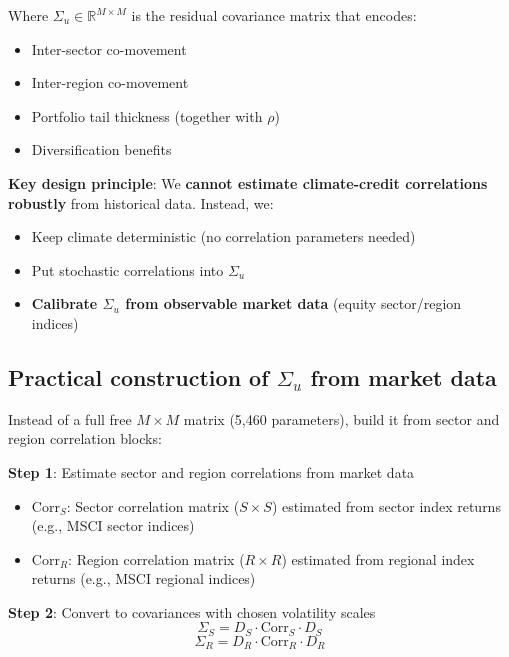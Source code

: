 \documentclass[11pt,a4paper]{article}
\begin{document}
Where $\Sigma_u \in \mathbb{R}^{M \times M}$ is the residual covariance matrix that encodes:
\begin{itemize}
    \item Inter-sector co-movement
    \item Inter-region co-movement
    \item Portfolio tail thickness (together with $\rho$)
    \item Diversification benefits
\end{itemize}

\textbf{Key design principle}: We \textbf{cannot estimate climate-credit correlations robustly} from historical data. Instead, we:
\begin{itemize}
    \item Keep climate deterministic (no correlation parameters needed)
    \item Put stochastic correlations into $\Sigma_u$
    \item \textbf{Calibrate $\Sigma_u$ from observable market data} (equity sector/region indices)
\end{itemize}

\subsection{Practical construction of $\Sigma_u$ from market data}

Instead of a full free $M \times M$ matrix (5,460 parameters), build it from sector and region correlation blocks:

\textbf{Step 1}: Estimate sector and region correlations from market data
\begin{itemize}
    \item $\text{Corr}_S$: Sector correlation matrix ($S \times S$) estimated from sector index returns (e.g., MSCI sector indices)
    \item $\text{Corr}_R$: Region correlation matrix ($R \times R$) estimated from regional index returns (e.g., MSCI regional indices)
\end{itemize}

\textbf{Step 2}: Convert to covariances with chosen volatility scales
\begin{equation}
\Sigma_S = D_S \cdot \text{Corr}_S \cdot D_S
\end{equation}
\begin{equation}
\Sigma_R = D_R \cdot \text{Corr}_R \cdot D_R
\end{equation}
\end{document}
